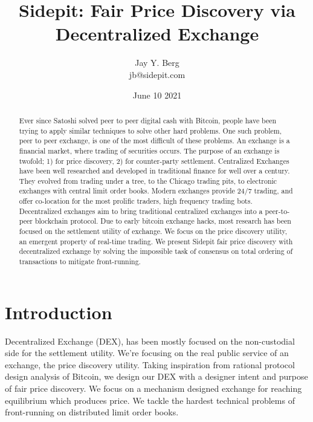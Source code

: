 \documentclass[12pt]{article}
\title{Sidepit: Fair Price Discovery via Decentralized Exchange}
\author{Jay Y. Berg \\jb@sidepit.com}
\date{June 10 2021}
\begin{document}
\parindent 0cm
\parskip   6pt
\maketitle




\begin{abstract}
Ever since Satoshi solved peer to peer digital cash with Bitcoin, people have been trying to apply similar techniques to solve other hard problems. One such problem, peer to peer exchange, is one of the most difficult of these problems. An exchange is a financial market, where trading of securities occurs. The purpose of an exchange is twofold; 1) for price discovery, 2) for counter-party settlement. Centralized Exchanges have been well researched and developed in traditional finance for well over a century. They evolved from trading under a tree, to the Chicago trading pits, to electronic exchanges with central limit order books. Modern exchanges provide 24/7 trading, and offer co-location for the most prolific traders, high frequency trading bots. Decentralized exchanges aim to bring traditional centralized exchanges into a peer-to-peer blockchain protocol. Due to early bitcoin exchange hacks, most research has been focused on the settlement utility of exchange. We focus on the price discovery utility, an emergent property of real-time trading. We present Sidepit fair price discovery with decentralized exchange by solving the impossible task of consensus on total ordering of transactions to mitigate front-running. 
\end{abstract}

\section*{Introduction}
Decentralized Exchange (DEX), has been mostly focused on the non-custodial side for the settlement utility. We're focusing on the real public service of an exchange, the price discovery utility. Taking inspiration from rational protocol design analysis of Bitcoin, we design our DEX with a designer intent and purpose of fair price discovery. We focus on a mechanism designed exchange for reaching equilibrium which produces price. We tackle the hardest technical problems of front-running on distributed limit order books.    
\end{document}
